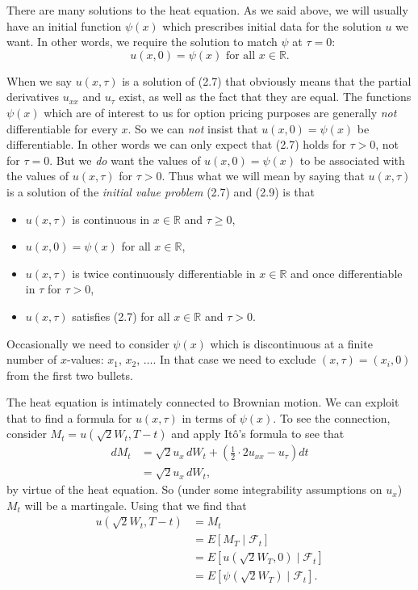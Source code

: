 There are many solutions to the heat equation. As we said above, we will usually have an initial function \(\psi(x)\) which prescribes initial data for the solution \(u\) we want. In other words, we require the solution to match \(\psi\) at \(\tau = 0\):
\[
u(x,0) = \psi(x) \text{ for all } x \in \mathbb{R}. \tag{2.9}
\]

When we say \(u(x,\tau)\) is a solution of (2.7) that obviously means that the partial derivatives \(u_{xx}\) and \(u_{\tau}\) exist, as well as the fact that they are equal. The functions \(\psi(x)\) which are of interest to us for option pricing purposes are generally \textit{not} differentiable for every \(x\). So we can \textit{not} insist that \(u(x,0) = \psi(x)\) be differentiable. In other words we can only expect that (2.7) holds for \(\tau > 0\), not for \(\tau = 0\). But we \textit{do} want the values of \(u(x,0) = \psi(x)\) to be associated with the values of \(u(x,\tau)\) for \(\tau > 0\). Thus what we will mean by saying that \(u(x,\tau)\) is a solution of the \textit{initial value problem} (2.7) and (2.9) is that

\begin{itemize}
    \item \(u(x,\tau)\) is continuous in \(x \in \mathbb{R}\) and \(\tau \geq 0\),
    \item \(u(x,0) = \psi(x)\) for all \(x \in \mathbb{R}\),
    \item \(u(x,\tau)\) is twice continuously differentiable in \(x \in \mathbb{R}\) and once differentiable in \(\tau\) for \(\tau > 0\),
    \item \(u(x,\tau)\) satisfies (2.7) for all \(x \in \mathbb{R}\) and \(\tau > 0\).
\end{itemize}

Occasionally we need to consider \(\psi(x)\) which is discontinuous at a finite number of \(x\)-values: \(x_1\), \(x_2\), $\dots$. In that case we need to exclude \((x,\tau) = (x_i, 0)\) from the first two bullets.

The heat equation is intimately connected to Brownian motion. We can exploit that to find a formula for \(u(x,\tau)\) in terms of \(\psi(x)\). To see the connection, consider \(M_t = u(\sqrt{2} W_t, T - t)\) and apply It\^o's formula to see that
\begin{align*}
d M_t &= \sqrt{2} u_x \, d W_t + \left( \frac{1}{2} \cdot 2 u_{xx} - u_{\tau} \right) dt \\
&= \sqrt{2} u_x \, d W_t,
\end{align*}
by virtue of the heat equation. So (under some integrability assumptions on \(u_x\)) \(M_t\) will be a martingale. Using that we find that
\begin{align*}
u(\sqrt{2} W_t, T - t) &= M_t \\
&= E[M_T \mid \mathcal{F}_t] \\
&= E[u(\sqrt{2} W_T, 0) \mid \mathcal{F}_t] \\
&= E[\psi(\sqrt{2} W_T) \mid \mathcal{F}_t]. \tag{2.11}
\end{align*}

